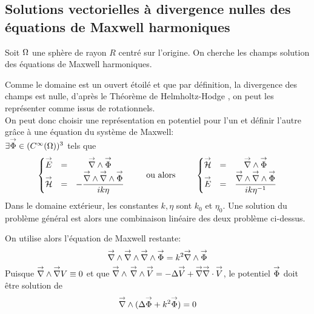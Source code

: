 \subsection{Solutions vectorielles à divergence nulles des équations de Maxwell harmoniques}
\label{sec:sol_maxwell}


Soit \(\Omega\) une sphère de rayon \(R\) centré sur l'origine. On cherche les champs solution des équations de Maxwell harmoniques.

Comme le domaine est un ouvert étoilé et que par définition, la divergence des champs est nulle, d'après le Théorème de Helmholtz-Hodge \cite{gui_rigorous_2007}, on peut les représenter comme issus de rotationnels.\\
On peut donc choisir une représentation en potentiel pour l'un et définir l'autre grâce à une équation du système de Maxwell:\\
 \(\exists {\overset{\rightarrow}{\Phi}} \in (C^\infty(\Omega))^3\) tels que
\begin{equation}
  \label{eq:sol_maxwell:pot_hertz}
  \left\lbrace\begin{matrix}
    \vE &=& \vrot \vect \Phi \\
    \vH &=& - \frac{\vrot \vrot \vect \Phi}{ik\eta}
  \end{matrix} \right.
  \qquad \text{ ou alors } \qquad
  \left\lbrace\begin{matrix}
    \vH &=& \vrot \vect \Phi\\
    \vE &=& \frac{\vrot \vrot \vect \Phi}{ik\eta^{-1}}\\
  \end{matrix}\right.
\end{equation}
Dans le domaine extérieur, les constantes \(k,\eta\) sont \(k_0\) et \(\eta_0\).
Une solution du problème général est alors une combinaison linéaire des deux problème ci-dessus.

On utilise alors l'équation de Maxwell restante:
\[
    {\overset{\rightarrow}{\nabla}}\wedge {\overset{\rightarrow}{\nabla}}\wedge {\overset{\rightarrow}{\nabla}}\wedge {\overset{\rightarrow}{\Phi}} = k^2 {\overset{\rightarrow}{\nabla}}\wedge {\overset{\rightarrow}{\Phi}}
\]
Puisque \({\overset{\rightarrow}{\nabla}}\wedge  {\overset{\rightarrow}{\nabla}}  V  \equiv 0\) et que \({\overset{\rightarrow}{\nabla}}\wedge\, {\overset{\rightarrow}{\nabla}}\wedge {\overset{\rightarrow}{V}} = -\Delta {\overset{\rightarrow}{V}} + {\overset{\rightarrow}{\nabla}} {\overset{\rightarrow}{\nabla}}\cdot {\overset{\rightarrow}{V}}\), le potentiel \({\overset{\rightarrow}{\Phi}}\) doit être solution de
\begin{equation}
  \label{eq:sol_maxwell:helmholtz_vect}
  \vrot ( \lapl \vect \Phi + k^2 \vect \Phi ) = 0
\end{equation}

